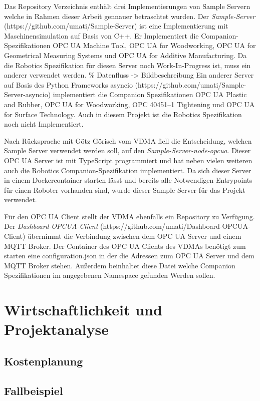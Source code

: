 \documentclass[a4paper, 12pt, oneside, toc=listofnumbered, bibliography=totoc]{scrbook}
\begin{document}
		Das Repository Verzeichnis enthält drei Implementierungen von Sample Servern welche in Rahmen dieser Arbeit gennauer betraschtet wurden. Der \textit{Sample-Server} \linebreak (https://github.com/umati/Sample-Server) ist eine Implementierung mit Maschinensimulation auf Basis von C++. Er Implementiert die Companion-Spezifikationen OPC UA Machine Tool, OPC UA for Woodworking, OPC UA for Geometrical Measuring Systems und OPC UA for Additive Manufacturing. Da die Robotics Spezifikation für diesen Server noch Work-In-Progress ist, muss ein anderer verwendet werden.
		\% Datenfluss -> Bildbeschreibung
		Ein anderer Server auf Basis des Python Frameworks asyncio (https://github.com/umati/Sample-Server-asyncio) implementiert die Companion Spezifikationen OPC UA Plastic and Rubber, OPC UA for Woodworking, OPC 40451–1 Tightening und OPC UA for Surface Technology. Auch in diesem Projekt ist die Robotics Spezifikation noch nicht Implementiert.
		
		Nach Rücksprache mit Götz Görisch vom VDMA fiell die Entscheidung, welchen Sample Server verwendet werden soll, auf den \textit{Sample-Server-node-opcua}. Dieser OPC UA Server ist mit TypeScript programmiert und hat neben vielen weiteren auch die Robotics Companion-Spezifikation implementiert. Da sich dieser Server in einem Dockercontainer starten lässt und bereits alle Notwendigen Entrypoints für einen Roboter vorhanden sind, wurde dieser Sample-Server für das Projekt verwendet.
		
		Für den OPC UA Client stellt der VDMA ebenfalls ein Repository zu Verfügung. Der \textit{Dashboard-OPCUA-Client} (https://github.com/umati/Dashboard-OPCUA-Client) übernimmt die Verbindung zwischen dem OPC UA Server und einem MQTT Broker. Der Container des OPC UA Clients des VDMAs benötigt zum starten eine configuration.json in der die Adressen zum OPC UA Server und dem MQTT Broker stehen. Außerdem beinhaltet diese Datei welche Companion Spezifikationen im angegebenen Namespace gefunden Werden sollen. 
		
	\section{Wirtschaftlichkeit und Projektanalyse}
	
		\subsection{Kostenplanung}
		
		\subsection{Fallbeispiel}
	
\end{document}
